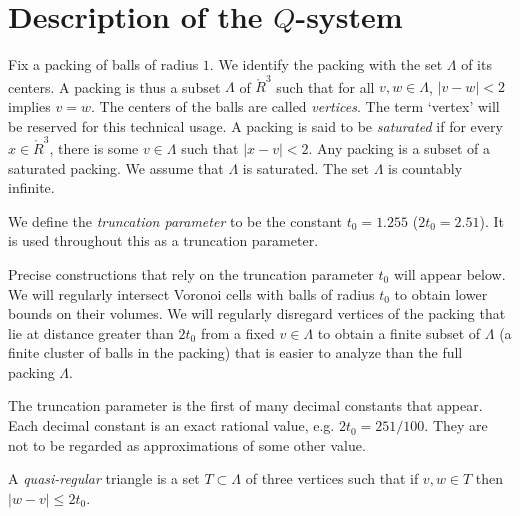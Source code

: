 \section{Description of the $Q$-system}
\label{sec:Q-describe}
\label{sec:construction}



Fix a packing of balls of radius $1$. We identify the packing with
the set $\Lambda$ of its centers.  A packing is thus a subset
$\Lambda$ of $\ring{R}^3$ such that for all $v,w\in\Lambda$,
$|v-w|<2$ implies $v=w$. The centers of the balls are called {\it
{} vertices}. The term `vertex' will be reserved for
this technical usage.  A packing is said to be {\it
{} saturated\/} if for every $x\in\ring{R}^3$,
there is some $v\in\Lambda$ such that $|x-v|<2$. Any packing is a
subset of a saturated packing. We assume that $\Lambda$ is
saturated. The set $\Lambda$ is countably infinite.

\begin{definition}  We define the {\it truncation parameter}
 to be the constant
$t_0=1.255$ ($2t_0 = 2.51$). It is used throughout this \paper as
a truncation parameter.
\end{definition}

\bigskip



Precise constructions that rely on the truncation parameter $t_0$
will appear below.  We will regularly intersect Voronoi cells with
balls of radius $t_0$ to obtain lower bounds on their volumes.  We
will regularly disregard vertices of the packing that lie at
distance greater than $2t_0$ from a fixed $v\in\Lambda$ to obtain
a finite subset of $\Lambda$ (a finite cluster of balls in the
packing) that is easier to analyze than the full packing
$\Lambda$.

The truncation parameter is the first of many decimal constants
that appear. Each decimal constant is an exact rational value,
e.g. $2t_0 = 251/100$.  They are not to be regarded as
approximations of some other value.

\begin{definition}
A {\it quasi-regular\/} triangle is
a set $T\subset \Lambda$ of three vertices such that if $v,w\in T$
then $|w-v|\le2t_0$. \end{definition}

